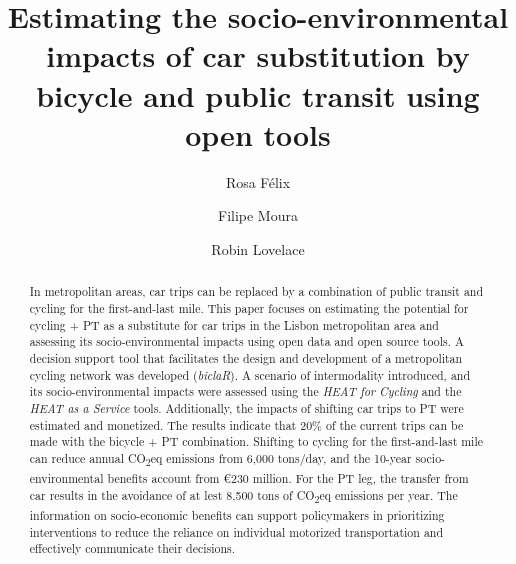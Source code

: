\documentclass[runningheads]{llncs}
\begin{document}
\title{Estimating the socio-environmental impacts of car substitution by
bicycle and public transit using open tools}
%
%
\author{Rosa Félix \and Filipe
Moura \and Robin
Lovelace}


%


\maketitle              %
%
\begin{abstract}
In metropolitan areas, car trips can be replaced by a combination of
public transit and cycling for the first-and-last mile. This paper
focuses on estimating the potential for cycling + PT as a substitute for
car trips in the Lisbon metropolitan area and assessing its
socio-environmental impacts using open data and open source tools. A
decision support tool that facilitates the design and development of a
metropolitan cycling network was developed (\emph{biclaR}). A scenario
of intermodality introduced, and its socio-environmental impacts were
assessed using the \emph{HEAT for Cycling} and the \emph{HEAT as a
Service} tools. Additionally, the impacts of shifting car trips to PT
were estimated and monetized. The results indicate that 20\% of the
current trips can be made with the bicycle + PT combination. Shifting to
cycling for the first-and-last mile can reduce annual
CO\textsubscript{2}eq emissions from 6,000 tons/day, and the 10-year
socio-environmental benefits account from €230 million. For the PT leg,
the transfer from car results in the avoidance of at lest 8,500 tons of
CO\textsubscript{2}eq emissions per year. The information on
socio-economic benefits can support policymakers in prioritizing
interventions to reduce the reliance on individual motorized
transportation and effectively communicate their decisions.


\end{abstract}
\end{document}
